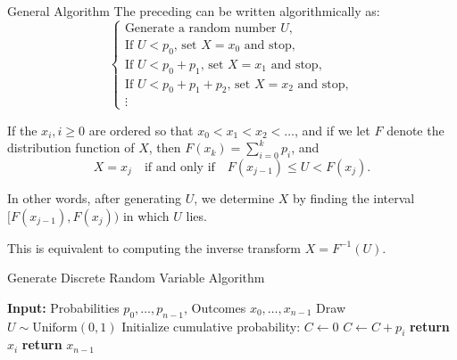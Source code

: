 \documentclass[8pt]{beamer}
\begin{document}
\begin{frame}{General Algorithm}
The preceding can be written algorithmically as:
\begin{equation*}
	\begin{cases}
		\text{Generate a random number $U$},\\
		\text{If $U < p_0$, set $X = x_0$ and stop},\\
		\text{If $U < p_0 + p_1$, set $X = x_1$ and stop},\\
		\text{If $U < p_0 + p_1 + p_2$, set $X = x_2$ and stop},\\
		\vdots
	\end{cases}
\end{equation*}

\vspace{2mm}

If the $x_i, i \geq 0$ are ordered so that $x_0 < x_1 < x_2 < \dots$, and if we let $F$ denote the distribution function of $X$, then $F(x_k) = \sum_{i=0}^{k} p_i$, and
\begin{equation*}
	X = x_j \quad \text{if and only if} \quad F(x_{j-1}) \leq U < F(x_j).
\end{equation*}

\vspace{2mm}

In other words, after generating $U$, we determine $X$ by finding the interval $[F(x_{j-1}), F(x_j))$ in which $U$ lies.

\vspace{1mm}
This is equivalent to computing the inverse transform $X = F^{-1}(U)$.

\end{frame}

\begin{frame}{Generate Discrete Random Variable Algorithm}
\begin{algorithm}[H]
    \caption{Naive Inverse Transform Sampling for Discrete RV}\label{alg:discrete-inverse}
    \begin{algorithmic}[1]
        \small
        \State \textbf{Input:} Probabilities $p_0, \dots, p_{n-1}$, Outcomes $x_0, \dots, x_{n-1}$
        \State Draw $U \sim \text{Uniform}(0,1)$
        \State Initialize cumulative probability: $C \gets 0$
         
            \State $C \gets C + p_i$
                \State \textbf{return} $x_i$
            \EndIf
        \EndFor
        \State \textbf{return} $x_{n-1}$ 
    \end{algorithmic}
\end{algorithm}
\end{frame}
\end{document}
